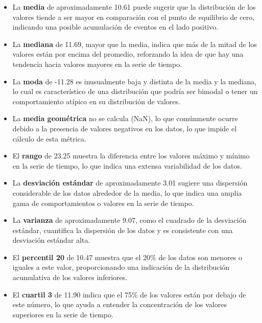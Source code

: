 \documentclass[11pt]{article} %
\begin{document}
	\begin{itemize}
		\item La \textbf{media} de aproximadamente 10.61 puede sugerir que la distribución de los valores tiende a ser mayor en comparación con el punto de equilibrio de cero, indicando una posible acumulación de eventos en el lado positivo.
		
		\item La \textbf{mediana} de 11.69, mayor que la media, indica que más de la mitad de los valores están por encima del promedio, reforzando la idea de que hay una tendencia hacia valores mayores en la serie de tiempo.
		
		\item La \textbf{moda} de -11.28 es inusualmente baja y distinta de la media y la mediana, lo cual es característico de una distribución que podría ser bimodal o tener un comportamiento atípico en su distribución de valores.
		
		\item La \textbf{media geométrica} no se calcula (NaN), lo que comúnmente ocurre debido a la presencia de valores negativos en los datos, lo que impide el cálculo de esta métrica.
		
		\item El \textbf{rango} de 23.25 muestra la diferencia entre los valores máximo y mínimo en la serie de tiempo, lo que indica una extensa variabilidad de los datos.
		
		\item La \textbf{desviación estándar} de aproximadamente 3.01 sugiere una dispersión considerable de los datos alrededor de la media, lo que indica una amplia gama de comportamientos o valores en la serie de tiempo.
		
		\item La \textbf{varianza} de aproximadamente 9.07, como el cuadrado de la desviación estándar, cuantifica la dispersión de los datos y es consistente con una desviación estándar alta.
		
		\item El \textbf{percentil 20} de 10.47 muestra que el 20\% de los datos son menores o iguales a este valor, proporcionando una indicación de la distribución acumulativa de los valores inferiores.
		
		\item El \textbf{cuartil 3} de 11.90 indica que el 75\% de los valores están por debajo de este número, lo que ayuda a entender la concentración de los valores superiores en la serie de tiempo.
		

\end{itemize}
\end{document}
